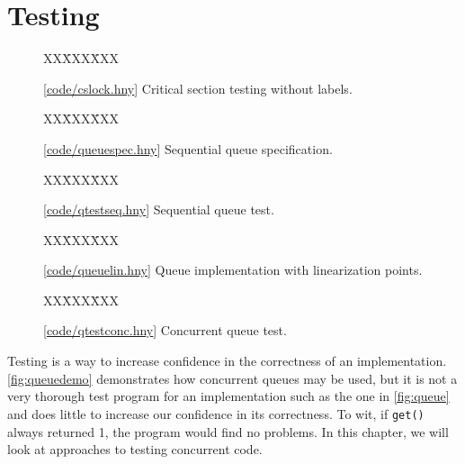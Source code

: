 \documentclass{report}
\newcommand{\harmonysource}[1]{
\begin{tabbing}
XX\=XXX\=XXX\kill
    
\end{tabbing}
}
\newcommand{\harmonylink}[1]{%
[\href{https://harmony.cs.cornell.edu/#1}{\underline{#1}}]%
}
\newenvironment{code}{
\tcolorbox
}{
\endtcolorbox
}
\begin{document}
\chapter{Testing}
\label{ch:testing}

\begin{figure}
\begin{code}
\harmonysource{cslock}
\end{code}
\caption{\harmonylink{code/cslock.hny} Critical section testing without labels.}
\label{fig:cslock}
\end{figure}

\begin{figure}
\begin{code}
\harmonysource{queuespec}
\end{code}
\caption{\harmonylink{code/queuespec.hny} Sequential queue specification.}
\label{fig:queuespec}
\end{figure}

\begin{figure}
\begin{code}
\harmonysource{qtestseq}
\end{code}
\caption{\harmonylink{code/qtestseq.hny} Sequential queue test.}
\label{fig:qtestseq}
\end{figure}

\begin{figure}
\begin{code}
\harmonysource{queuelin}
\end{code}
\caption{\harmonylink{code/queuelin.hny} Queue implementation with linearization points.}
\label{fig:queuelin}
\end{figure}

\begin{figure}
\begin{code}
\harmonysource{qtestconc}
\end{code}
\caption{\harmonylink{code/qtestconc.hny} Concurrent queue test.}
\label{fig:qtestconc}
\end{figure}

Testing is a way to increase confidence in the correctness
of an implementation.
\autoref{fig:queuedemo} demonstrates how concurrent queues
may be used, but it is not a very thorough test program
for an implementation such as the one in \autoref{fig:queue}
and does little to increase our confidence in its correctness.
To wit, if \texttt{get()} always returned 1, the program
would find no problems.
In this chapter, we will look at approaches to testing
concurrent code.
\end{document}
